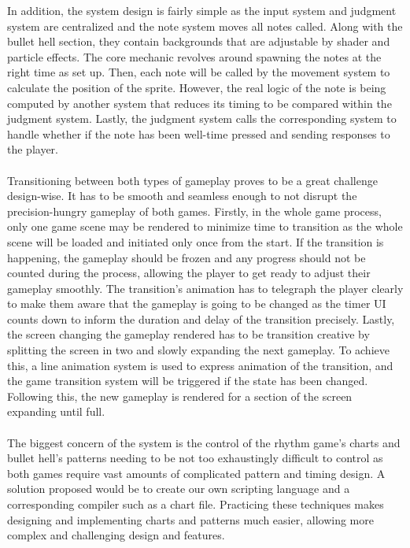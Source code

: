 In addition, the system design is fairly simple as the input system and judgment system are centralized
and the note system moves all notes called.
Along with the bullet hell section, they contain backgrounds that are adjustable by shader and particle effects.
The core mechanic revolves around spawning the notes at the right time as set up.
Then, each note will be called by the movement system to calculate the position of the sprite.
However, the real logic of the note is being computed by another system that reduces its timing to be
compared within the judgment system.
Lastly, the judgment system calls the corresponding system to handle whether if the note has been well-time pressed and sending responses to the player.
\\\\
Transitioning between both types of gameplay proves to be a great challenge design-wise.
It has to be smooth and seamless enough to not disrupt the precision-hungry gameplay of both games.
Firstly, in the whole game process, only one game scene may be rendered to minimize time to transition
as the whole scene will be loaded and initiated only once from the start.
If the transition is happening, the gameplay should be frozen and any progress should not be counted during the process,
allowing the player to get ready to adjust their gameplay smoothly.
The transition's animation has to telegraph the player clearly to make them aware that the gameplay is going to be changed
as the timer UI counts down to inform the duration and delay of the transition precisely.
Lastly, the screen changing the gameplay rendered has to be transition creative by splitting the screen in two and slowly expanding the next gameplay.
To achieve this, a line animation system is used to express animation of the transition, and the game transition system
will be triggered if the state has been changed.
Following this, the new gameplay is rendered for a section of the screen expanding until full.
\\\\
The biggest concern of the system is the control of the rhythm game's charts and bullet hell's patterns
needing to be not too exhaustingly difficult to control as both games require vast amounts of complicated pattern and timing design.
A solution proposed would be to create our own scripting language and a corresponding compiler such as a chart file.
Practicing these techniques makes designing and implementing charts and patterns much easier,
allowing more complex and challenging design and features.
\\\\
